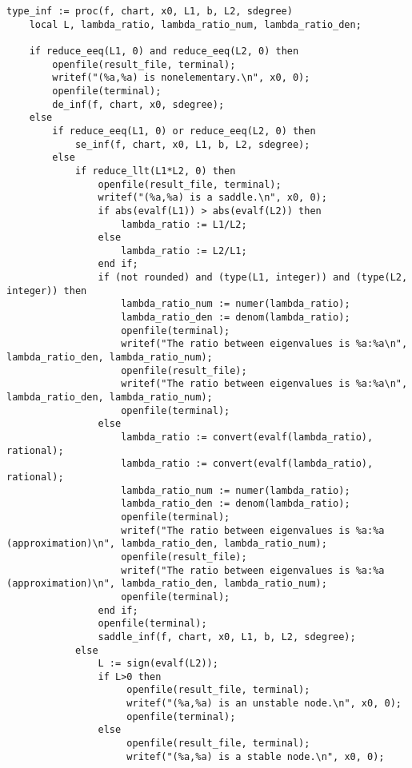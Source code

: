 \documentclass[a4paper,10pt]{article}
\begin{document}
\begin{lstlisting}[name=infinity]
type_inf := proc(f, chart, x0, L1, b, L2, sdegree)
    local L, lambda_ratio, lambda_ratio_num, lambda_ratio_den;

    if reduce_eeq(L1, 0) and reduce_eeq(L2, 0) then
        openfile(result_file, terminal);
        writef("(%a,%a) is nonelementary.\n", x0, 0);
        openfile(terminal);
        de_inf(f, chart, x0, sdegree);
    else
        if reduce_eeq(L1, 0) or reduce_eeq(L2, 0) then
            se_inf(f, chart, x0, L1, b, L2, sdegree);
        else
            if reduce_llt(L1*L2, 0) then
                openfile(result_file, terminal);
                writef("(%a,%a) is a saddle.\n", x0, 0);
                if abs(evalf(L1)) > abs(evalf(L2)) then
                    lambda_ratio := L1/L2;
                else
                    lambda_ratio := L2/L1;
                end if;
                if (not rounded) and (type(L1, integer)) and (type(L2, integer)) then 
                    lambda_ratio_num := numer(lambda_ratio);
                    lambda_ratio_den := denom(lambda_ratio);
                    openfile(terminal);
                    writef("The ratio between eigenvalues is %a:%a\n", lambda_ratio_den, lambda_ratio_num);
                    openfile(result_file);
                    writef("The ratio between eigenvalues is %a:%a\n", lambda_ratio_den, lambda_ratio_num);
                    openfile(terminal);
                else
                    lambda_ratio := convert(evalf(lambda_ratio), rational);
                    lambda_ratio := convert(evalf(lambda_ratio), rational);
                    lambda_ratio_num := numer(lambda_ratio);
                    lambda_ratio_den := denom(lambda_ratio);
                    openfile(terminal);
                    writef("The ratio between eigenvalues is %a:%a (approximation)\n", lambda_ratio_den, lambda_ratio_num);
                    openfile(result_file);
                    writef("The ratio between eigenvalues is %a:%a (approximation)\n", lambda_ratio_den, lambda_ratio_num);
                    openfile(terminal);
                end if;
                openfile(terminal);
                saddle_inf(f, chart, x0, L1, b, L2, sdegree);
            else
                L := sign(evalf(L2));
                if L>0 then
                     openfile(result_file, terminal);
                     writef("(%a,%a) is an unstable node.\n", x0, 0);
                     openfile(terminal);
                else
                     openfile(result_file, terminal);
                     writef("(%a,%a) is a stable node.\n", x0, 0);

\end{lstlisting}
\end{document}
